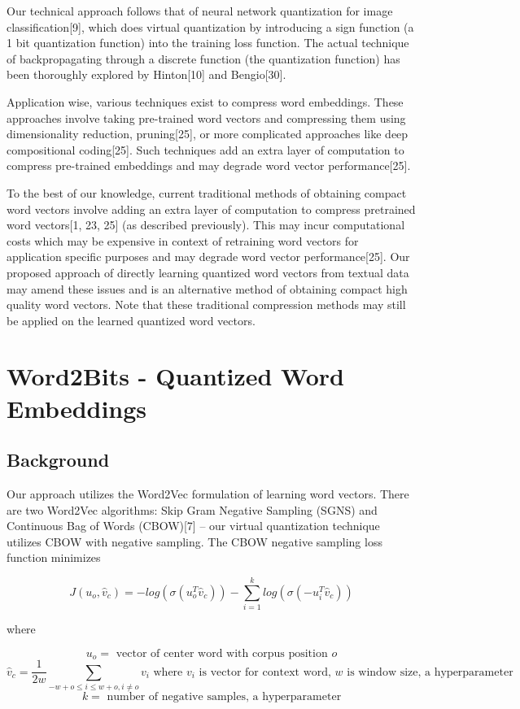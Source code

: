 \documentclass{article} %
\begin{document}
Our technical approach follows that of neural network quantization for
image classification[9], which does virtual quantization by
introducing a sign function (a 1 bit quantization function) into the
training loss function. The actual technique of backpropagating through a
discrete function (the quantization function) has been thoroughly
explored by Hinton[10] and Bengio[30].

Application wise, various techniques exist to compress word
embeddings. These approaches involve taking pre-trained word
vectors and compressing them using dimensionality reduction,
pruning[25], or more complicated approaches like deep compositional
coding[25]. Such techniques add an extra layer of computation to
compress pre-trained embeddings and may degrade word vector
performance[25].

To the best of our knowledge, current traditional methods of obtaining
compact word vectors involve adding an extra layer of computation to
compress pretrained word vectors[1, 23, 25] (as described previously). This
may incur computational costs which may be expensive in context of
retraining word vectors for application specific purposes and may
degrade word vector performance[25]. Our proposed approach of directly
learning quantized word vectors from textual data may amend these
issues and is an alternative method of obtaining compact high quality
word vectors. Note that these traditional compression methods may
still be applied on the learned quantized word vectors.

\section{Word2Bits - Quantized Word Embeddings}
\subsection{Background}
Our approach utilizes the Word2Vec formulation of learning word vectors. There
are two Word2Vec algorithms: Skip Gram Negative Sampling (SGNS) and
Continuous Bag of Words (CBOW)[7] -- our virtual quantization
technique utilizes CBOW with negative sampling. The CBOW negative
sampling loss function minimizes

$$
J(u_o, \hat{v}_c) = -log(\sigma(u_o^T\hat{v}_c)) - \sum_{i=1}^{k} log(\sigma(-u_i^T\hat{v}_c))
$$

where

$$
u_o = \mbox{ vector of center word with corpus position } o
$$
$$
\hat{v}_c = \frac{1}{2w}\sum_{-w+o \leq i \leq w+o,i \neq o} v_i \mbox{  where } v_i \mbox{ is vector for context word, } w \mbox{ is window size, a hyperparameter}
$$
$$
k = \mbox{ number of negative samples, a hyperparameter}
$$
\end{document}
